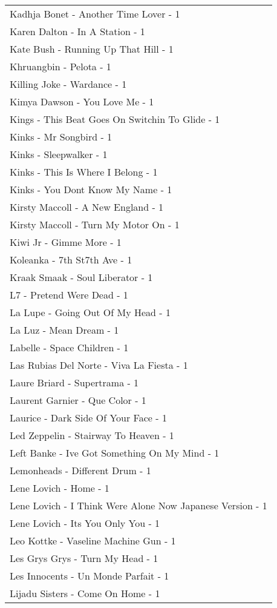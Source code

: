 \documentclass[
]{article}
\begin{document}
\begin{longtable}{l}
Kadhja Bonet - Another Time Lover - 1 \\ 
Karen Dalton - In A Station - 1 \\ 
Kate Bush - Running Up That Hill - 1 \\ 
Khruangbin - Pelota - 1 \\ 
Killing Joke - Wardance - 1 \\ 
Kimya Dawson - You Love Me - 1 \\ 
Kings - This Beat Goes On Switchin To Glide - 1 \\ 
Kinks - Mr Songbird - 1 \\ 
Kinks - Sleepwalker - 1 \\ 
Kinks - This Is Where I Belong - 1 \\ 
Kinks - You Dont Know My Name - 1 \\ 
Kirsty Maccoll - A New England - 1 \\ 
Kirsty Maccoll - Turn My Motor On - 1 \\ 
Kiwi Jr - Gimme More - 1 \\ 
Koleanka - 7th St7th Ave - 1 \\ 
Kraak Smaak - Soul Liberator - 1 \\ 
L7 - Pretend Were Dead - 1 \\ 
La Lupe - Going Out Of My Head - 1 \\ 
La Luz - Mean Dream - 1 \\ 
Labelle - Space Children - 1 \\ 
Las Rubias Del Norte - Viva La Fiesta - 1 \\ 
Laure Briard - Supertrama - 1 \\ 
Laurent Garnier - Que Color - 1 \\ 
Laurice - Dark Side Of Your Face - 1 \\ 
Led Zeppelin - Stairway To Heaven - 1 \\ 
Left Banke - Ive Got Something On My Mind - 1 \\ 
Lemonheads - Different Drum - 1 \\ 
Lene Lovich - Home - 1 \\ 
Lene Lovich - I Think Were Alone Now Japanese Version - 1 \\ 
Lene Lovich - Its You Only You - 1 \\ 
Leo Kottke - Vaseline Machine Gun - 1 \\ 
Les Grys Grys - Turn My Head - 1 \\ 
Les Innocents - Un Monde Parfait - 1 \\ 
Lijadu Sisters - Come On Home - 1 \\ 

\end{longtable}
\end{document}
